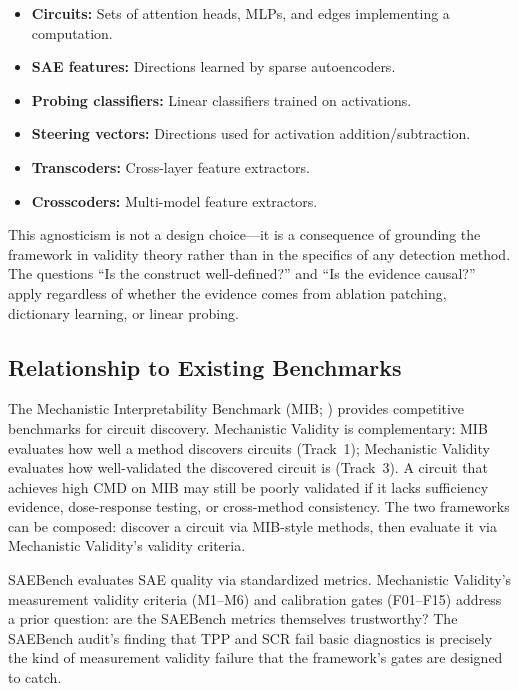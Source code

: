 \documentclass[10pt]{article}
\begin{document}
\begin{itemize}[nosep]
    \item \textbf{Circuits:} Sets of attention heads, MLPs, and edges implementing a computation.
    \item \textbf{SAE features:} Directions learned by sparse autoencoders.
    \item \textbf{Probing classifiers:} Linear classifiers trained on activations.
    \item \textbf{Steering vectors:} Directions used for activation addition/subtraction.
    \item \textbf{Transcoders:} Cross-layer feature extractors.
    \item \textbf{Crosscoders:} Multi-model feature extractors.
\end{itemize}

This agnosticism is not a design choice---it is a consequence of grounding the framework in validity theory rather than in the specifics of any detection method. The questions ``Is the construct well-defined?'' and ``Is the evidence causal?'' apply regardless of whether the evidence comes from ablation patching, dictionary learning, or linear probing.

\subsection{Relationship to Existing Benchmarks}

The Mechanistic Interpretability Benchmark (MIB; \citealp{mueller2025mib}) provides competitive benchmarks for circuit discovery. Mechanistic Validity is complementary: MIB evaluates how well a method discovers circuits (Track~1); Mechanistic Validity evaluates how well-validated the discovered circuit is (Track~3). A circuit that achieves high CMD on MIB may still be poorly validated if it lacks sufficiency evidence, dose-response testing, or cross-method consistency. The two frameworks can be composed: discover a circuit via MIB-style methods, then evaluate it via Mechanistic Validity's validity criteria.

SAEBench evaluates SAE quality via standardized metrics. Mechanistic Validity's measurement validity criteria (M1--M6) and calibration gates (F01--F15) address a prior question: are the SAEBench metrics themselves trustworthy? The SAEBench audit's finding that TPP and SCR fail basic diagnostics is precisely the kind of measurement validity failure that the framework's gates are designed to catch.
\end{document}
